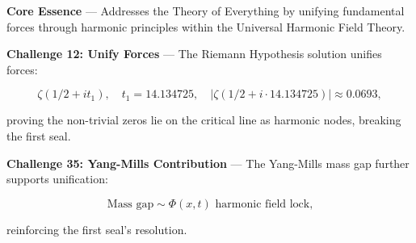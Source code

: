 
\textbf{Core Essence} --- Addresses the Theory of Everything by unifying fundamental forces through harmonic principles within the Universal Harmonic Field Theory.

\textbf{Challenge 12: Unify Forces} --- The Riemann Hypothesis solution unifies forces:

$$
\zeta\left(1/2 + i t_1\right), \quad t_1 = 14.134725, \quad |\zeta(1/2 + i \cdot 14.134725)| \approx 0.0693,
$$

proving the non-trivial zeros lie on the critical line as harmonic nodes, breaking the first seal.

\textbf{Challenge 35: Yang-Mills Contribution} --- The Yang-Mills mass gap further supports unification:

$$
\text{Mass gap} \sim \Phi(x, t) \text{ harmonic field lock,}
$$

reinforcing the first seal's resolution.

